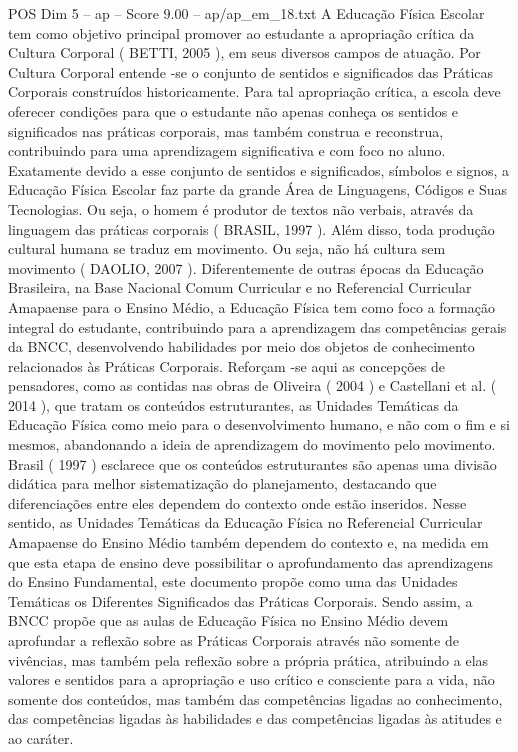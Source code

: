 \begin{textsample}{POS Dim 5 – ap – Score 9.00 – ap/ap\_em\_18.txt}
A Educação Física Escolar tem como objetivo principal promover ao estudante a apropriação crítica da Cultura Corporal ( BETTI, 2005 ), em seus diversos campos de atuação.
Por Cultura Corporal entende -se o conjunto de sentidos e significados das Práticas Corporais construídos historicamente.
Para tal apropriação crítica, a escola deve oferecer condições para que o estudante não apenas conheça os sentidos e significados nas práticas corporais, mas também construa e reconstrua, contribuindo para uma aprendizagem significativa e com foco no aluno.
Exatamente devido a esse conjunto de sentidos e significados, símbolos e signos, a Educação Física Escolar faz parte da grande Área de Linguagens, Códigos e Suas Tecnologias.
Ou seja, o homem é produtor de textos não verbais, através da linguagem das práticas corporais ( BRASIL, 1997 ).
Além disso, toda produção cultural humana se traduz em movimento.
Ou seja, não há cultura sem movimento ( DAOLIO, 2007 ).
Diferentemente de outras épocas da Educação Brasileira, na Base Nacional Comum Curricular e no Referencial Curricular Amapaense para o Ensino Médio, a Educação Física tem como foco a formação integral do estudante, contribuindo para a aprendizagem das competências gerais da BNCC, desenvolvendo habilidades por meio dos objetos de conhecimento relacionados às Práticas Corporais.
Reforçam -se aqui as concepções de pensadores, como as contidas nas obras de Oliveira ( 2004 ) e Castellani et al. ( 2014 ), que tratam os conteúdos estruturantes, as Unidades Temáticas da Educação Física como meio para o desenvolvimento humano, e não com o fim e si mesmos, abandonando a ideia de aprendizagem do movimento pelo movimento.
Brasil ( 1997 ) esclarece que os conteúdos estruturantes são apenas uma divisão didática para melhor sistematização do planejamento, destacando que diferenciações entre eles dependem do contexto onde estão inseridos.
Nesse sentido, as Unidades Temáticas da Educação Física no Referencial Curricular Amapaense do Ensino Médio também dependem do contexto e, na medida em que esta etapa de ensino deve possibilitar o aprofundamento das aprendizagens do Ensino Fundamental, este documento propõe como uma das Unidades Temáticas os Diferentes Significados das Práticas Corporais.
Sendo assim, a BNCC propõe que as aulas de Educação Física no Ensino Médio devem aprofundar a reflexão sobre as Práticas Corporais através não somente de vivências, mas também pela reflexão sobre a própria prática, atribuindo a elas valores e sentidos para a apropriação e uso crítico e consciente para a vida, não somente dos conteúdos, mas também das competências ligadas ao conhecimento, das competências ligadas às habilidades e das competências ligadas às atitudes e ao caráter.

\end{textsample}
